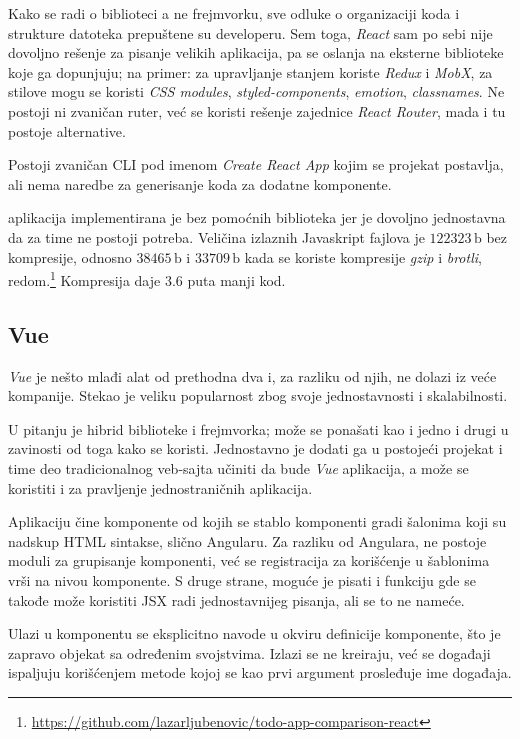 Kako se radi o biblioteci a ne frejmvorku, sve odluke o organizaciji koda i strukture datoteka prepuštene su developeru.
Sem toga, \textsl{React} sam po sebi nije dovoljno rešenje za pisanje velikih aplikacija, pa se oslanja na eksterne biblioteke koje ga dopunjuju; na primer: za upravljanje stanjem koriste \textsl{Redux} i \textsl{MobX}, za stilove mogu se koristi \textsl{CSS modules}, \textsl{styled-components}, \textsl{emotion}, \textsl{classnames}.
Ne postoji ni zvaničan ruter, već se koristi rešenje zajednice \textsl{React Router}, mada i tu postoje alternative.

Postoji zvaničan CLI pod imenom \textsl{Create React App} kojim se projekat postavlja, ali nema naredbe za generisanje koda za dodatne komponente.

 aplikacija implementirana je bez pomoćnih biblioteka jer je dovoljno jednostavna da za time ne postoji potreba.
Veličina izlaznih Javaskript fajlova je $122323\,\mathrm{b}$ bez kompresije, odnosno $38465\,\mathrm{b}$ i $33709\,\mathrm{b}$ kada se koriste kompresije \textsl{gzip} i \textsl{brotli}, redom.\footnote{\url{https://github.com/lazarljubenovic/todo-app-comparison-react}} Kompresija daje $3.6$ puta manji kod.

\subsection{Vue}

\textsl{Vue} je nešto mlađi alat od prethodna dva i, za razliku od njih, ne dolazi iz veće kompanije.
Stekao je veliku popularnost zbog svoje jednostavnosti i skalabilnosti.

U pitanju je hibrid biblioteke i frejmvorka; može se ponašati kao i jedno i drugi u zavinosti od toga kako se koristi.
Jednostavno je dodati ga u postojeći projekat i time deo tradicionalnog veb-sajta učiniti da bude \textsl{Vue} aplikacija, a može se koristiti i za pravljenje jednostraničnih aplikacija.

Aplikaciju čine komponente od kojih se stablo komponenti gradi šalonima koji su nadskup HTML sintakse, slično Angularu.
Za razliku od Angulara, ne postoje moduli za grupisanje komponenti, već se registracija za korišćenje u šablonima vrši na nivou komponente.
S druge strane, moguće je pisati i  funkciju gde se takođe može koristiti JSX radi jednostavnijeg pisanja, ali se to ne nameće.

Ulazi u komponentu se eksplicitno navode u okviru definicije komponente, što je zapravo objekat sa određenim svojstvima.
Izlazi se ne kreiraju, već se događaji ispaljuju korišćenjem metode  kojoj se kao prvi argument prosleđuje ime događaja.

